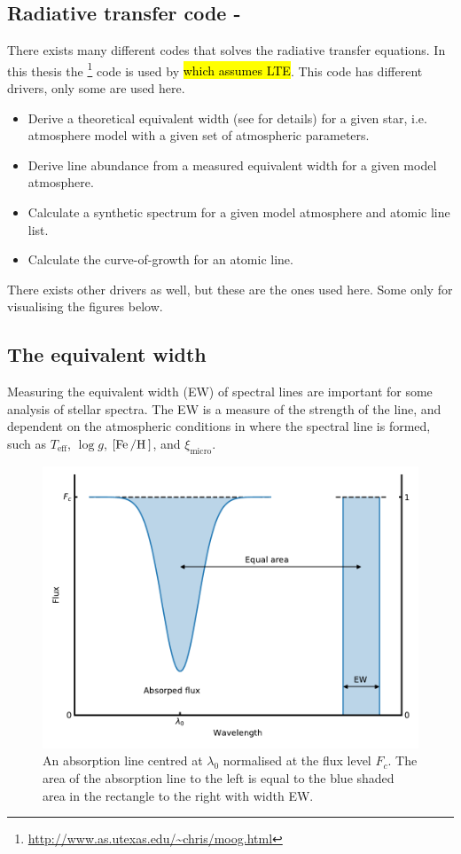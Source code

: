 \subsection{Radiative transfer code - }

There exists many different codes that solves the radiative transfer equations. In this thesis the
\footnote{\url{http://www.as.utexas.edu/~chris/moog.html}} code is used by
\citet{Sneden1973} \hl{which assumes LTE}. This code has different drivers, only some are used here.
\begin{itemize}
  \item Derive a theoretical equivalent width (see  for details) for a given star, i.e.
        atmosphere model with a given set of atmospheric parameters.
  \item Derive line abundance from a measured equivalent width for a given model atmosphere.
  \item Calculate a synthetic spectrum for a given model atmosphere and atomic line list.
  \item Calculate the curve-of-growth for an atomic line.
\end{itemize}
There exists other drivers as well, but these are the ones used here. Some only for visualising the
figures below.



\subsection{The equivalent width}
\label{sec:EW}

Measuring the equivalent width (EW) of spectral lines are important for some analysis of stellar
spectra. The EW is a measure of the strength of the line, and dependent on the atmospheric
conditions in where the spectral line is formed, such as $T_\mathrm{eff}$, $\log g$,
$[\ion{Fe}/\ion{H}]$, and $\xi_\mathrm{micro}$.

\begin{figure}[htpb!]
    \centering
    \includegraphics[width=0.85\linewidth]{figures/ewTheoretical.pdf}
    \caption{An absorption line centred at $\lambda_0$ normalised at the flux level $F_c$. The area
             of the absorption line to the left is equal to the blue shaded area in the rectangle to
             the right with width EW.}
    \label{fig:ewTheoretical}
\end{figure}

